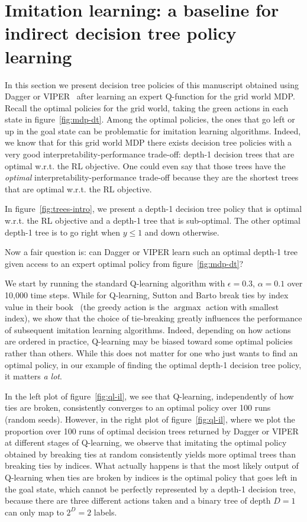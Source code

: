 \section{Imitation learning: a baseline for indirect decision tree policy learning}\label{sec:imit}

In this section we present decision tree policies of this manuscript obtained using Dagger or VIPER~\citep{dagger,viper} after learning an expert Q-function for the grid world MDP.
Recall the optimal policies for the grid world, taking the green actions in each state in figure~\ref{fig:mdp-dt}. 
Among the optimal policies, the ones that go left or up in the goal state can be problematic for imitation learning algorithms.
Indeed, we know that for this grid world MDP there exists decision tree policies with a very good interpretability-performance trade-off: depth-1 decision trees that are optimal w.r.t. the RL objective.
One could even say that those trees have the \textit{optimal} interpretability-performance trade-off because they are the shortest trees that are optimal w.r.t. the RL objective.

In figure~\ref{fig:trees-intro}, we present a depth-1 decision tree policy that is optimal w.r.t. the RL objective and a depth-1 tree that is sub-optimal.
The other optimal depth-1 tree is to go right when $y\leq 1$ and down otherwise.

Now a fair question is: can Dagger or VIPER learn such an optimal depth-1 tree given access to an expert optimal policy from figure~\ref{fig:mdp-dt}?

We start by running the standard Q-learning algorithm with $\epsilon=0.3$, $\alpha=0.1$ over 10,000 time steps.
While for Q-learning, Sutton and Barto break ties by index value in their book~\citep{sutton} (the greedy action is the $\operatorname{argmax}$ action with smallest index), we show that the choice of tie-breaking greatly influences the performance of subsequent imitation learning algorithms.
Indeed, depending on how actions are ordered in practice, Q-learning may be biased toward some optimal policies rather than others.
While this does not matter for one who just wants to find an optimal policy, in our example of finding the optimal depth-1 decision tree policy, it matters \textit{a lot}.

In the left plot of figure~\ref{fig:ql-il}, we see that Q-learning, independently of how ties are broken, consistently converges to an optimal policy over 100 runs (random seeds).
However, in the right plot of figure~\ref{fig:ql-il}, where we plot the proportion over 100 runs of optimal decision trees returned by Dagger or VIPER at different stages of Q-learning, we observe that imitating the optimal policy obtained by breaking ties at random consistently yields more optimal trees than breaking ties by indices.
What actually happens is that the most likely output of Q-learning when ties are broken by indices is the optimal policy that goes left in the goal state,
which cannot be perfectly represented by a depth-1 decision tree, because there are three different actions taken and a binary tree of depth $D=1$ can only map to $2^D=2$ labels.

